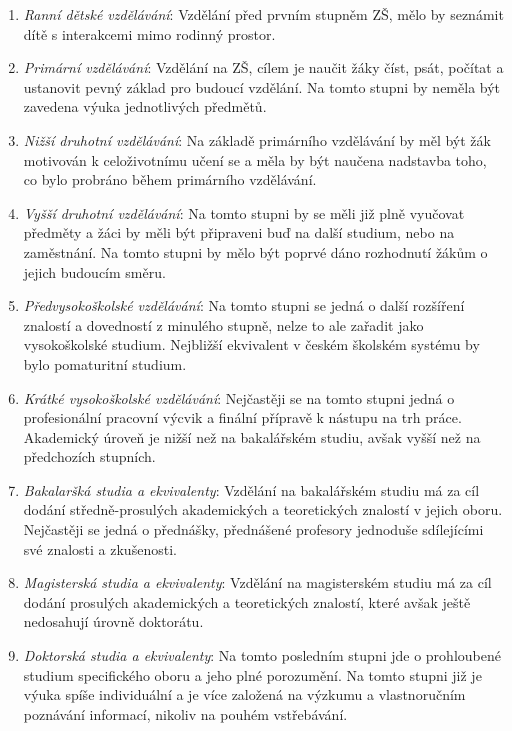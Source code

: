 \documentclass[12pt]{article}
\begin{document}
\begin{enumerate}
	\item{} \textit{Ranní dětské vzdělávání}: Vzdělání před prvním stupněm ZŠ, mělo by seznámit dítě s interakcemi mimo rodinný prostor.
	\item{} \textit{Primární vzdělávání}: Vzdělání na ZŠ, cílem je naučit žáky číst, psát, počítat a ustanovit pevný základ pro budoucí vzdělání. Na tomto stupni by neměla být zavedena výuka jednotlivých předmětů.
	\item{} \textit{Nižší druhotní vzdělávání}: Na základě primárního vzdělávání by měl být žák motivován k celoživotnímu učení se a měla by být naučena nadstavba toho, co bylo probráno během primárního vzdělávání.
	\item{} \textit{Vyšší druhotní vzdělávání}:  Na tomto stupni by se měli již plně vyučovat předměty a žáci by měli být připraveni buď na další studium, nebo na zaměstnání. Na tomto stupni by mělo být poprvé dáno rozhodnutí žákům o jejich budoucím směru.
	\item{} \textit{Předvysokoškolské vzdělávání}: Na tomto stupni se jedná o další rozšíření znalostí a dovedností z minulého stupně, nelze to ale zařadit jako vysokoškolské studium. Nejbližší ekvivalent v českém školském systému by bylo pomaturitní studium.
	\item{} \textit{Krátké vysokoškolské vzdělávání}: Nejčastěji se na tomto stupni jedná o profesionální pracovní výcvik a finální přípravě k nástupu na trh práce. Akademický úroveň je nižší než na bakalářském studiu, avšak vyšší než na předchozích stupních.
	\item{} \textit{Bakalaršká studia a ekvivalenty}: Vzdělání na bakalářském studiu má za cíl dodání středně-prosulých akademických a teoretických znalostí v jejich oboru. Nejčastěji se jedná o přednášky, přednášené profesory jednoduše sdílejícími své znalosti a zkušenosti.
	\item{} \textit{Magisterská studia a ekvivalenty}: Vzdělání na magisterském studiu má za cíl dodání prosulých akademických a teoretických znalostí, které avšak ještě nedosahují úrovně doktorátu.
	\item{} \textit{Doktorská studia a ekvivalenty}: Na tomto posledním stupni jde o prohloubené studium specifického oboru a jeho plné porozumění. Na tomto stupni již je výuka spíše individuální a je více založená na výzkumu a vlastnoručním poznávání informací, nikoliv na pouhém vstřebávání.

\end{enumerate} \cite{ISCED}
\end{document}
